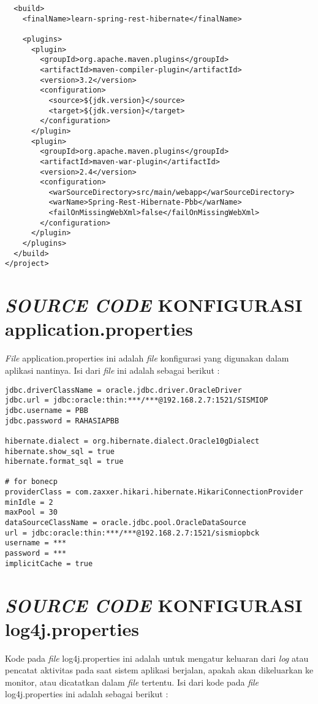 \documentclass[pdftex,12pt, oneside]{article}
\begin{document}
\begin{lstlisting}
  <build>
    <finalName>learn-spring-rest-hibernate</finalName>

    <plugins>
      <plugin>
        <groupId>org.apache.maven.plugins</groupId>
        <artifactId>maven-compiler-plugin</artifactId>
        <version>3.2</version>
        <configuration>
          <source>${jdk.version}</source>
          <target>${jdk.version}</target>
        </configuration>
      </plugin>
      <plugin>
        <groupId>org.apache.maven.plugins</groupId>
        <artifactId>maven-war-plugin</artifactId>
        <version>2.4</version>
        <configuration>
          <warSourceDirectory>src/main/webapp</warSourceDirectory>
          <warName>Spring-Rest-Hibernate-Pbb</warName>
          <failOnMissingWebXml>false</failOnMissingWebXml>
        </configuration>
      </plugin>
    </plugins>
  </build>
</project>
\end{lstlisting}


\section{\textit{SOURCE CODE} KONFIGURASI application.properties}

\textit{File} application.properties ini adalah \textit{file} konfigurasi yang digunakan dalam aplikasi nantinya. Isi dari \textit{file} ini adalah sebagai berikut :

\begin{lstlisting}
jdbc.driverClassName = oracle.jdbc.driver.OracleDriver
jdbc.url = jdbc:oracle:thin:***/***@192.168.2.7:1521/SISMIOP
jdbc.username = PBB
jdbc.password = RAHASIAPBB

hibernate.dialect = org.hibernate.dialect.Oracle10gDialect
hibernate.show_sql = true
hibernate.format_sql = true

# for bonecp
providerClass = com.zaxxer.hikari.hibernate.HikariConnectionProvider
minIdle = 2
maxPool = 30
dataSourceClassName = oracle.jdbc.pool.OracleDataSource
url = jdbc:oracle:thin:***/***@192.168.2.7:1521/sismiopbck
username = ***
password = ***
implicitCache = true
\end{lstlisting}


\section{\textit{SOURCE CODE} KONFIGURASI log4j.properties}

Kode pada \textit{file} log4j.properties ini adalah untuk mengatur keluaran dari \textit{log} atau pencatat aktivitas pada saat sistem aplikasi berjalan, apakah akan dikeluarkan ke monitor, atau dicatatkan dalam \textit{file} tertentu. Isi dari kode pada \textit{file} log4j.properties ini adalah sebagai berikut :
\end{document}
